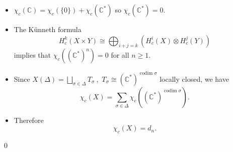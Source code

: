 \documentclass{beamer}
\newcommand{\C}{\mathbb{C}}
\begin{document}
\begin{frame}
\begin{itemize}
\item $\chi_c(\C) = \chi_c ( \{ 0 \} ) + \chi_c (\C^*)$ so $\chi_c (\C^*)=0.$
\item The K\"{u}nneth formula $$H^k_c ( X \times Y) \cong \bigoplus_{i+j=k} \left( H^i_c (X) \otimes H^j_c(Y) \right)$$ implies that $\chi_c ( (\C^*)^n )=0$ for all $n\geq 1.$
\item Since $X(\Delta) = \bigsqcup_{\sigma\in \Delta} T_{\sigma} \ ,$ $T_{\sigma} \cong (\C^*)^{\operatorname{codim} \sigma}$ locally closed, we have $$\chi_c(X) = \sum_{\sigma \in \Delta} \chi_c \left( (\C^*)^{\operatorname{codim} \sigma} \right).$$

\item Therefore $$\chi_c (X) = d_n.$$ 
\end{itemize}
\qed
 \end{frame}
\end{document}
